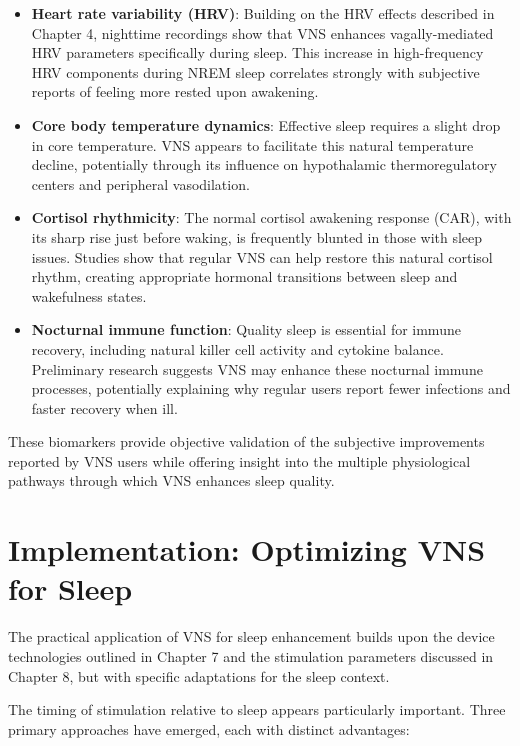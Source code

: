 \documentclass[
  Letterpaper,
]{scrbook}
\begin{document}
\begin{itemize}
\item
  \textbf{Heart rate variability (HRV)}: Building on the HRV effects
  described in Chapter 4, nighttime recordings show that VNS enhances
  vagally-mediated HRV parameters specifically during sleep. This
  increase in high-frequency HRV components during NREM sleep correlates
  strongly with subjective reports of feeling more rested upon
  awakening.
\item
  \textbf{Core body temperature dynamics}: Effective sleep requires a
  slight drop in core temperature. VNS appears to facilitate this
  natural temperature decline, potentially through its influence on
  hypothalamic thermoregulatory centers and peripheral vasodilation.
\item
  \textbf{Cortisol rhythmicity}: The normal cortisol awakening response
  (CAR), with its sharp rise just before waking, is frequently blunted
  in those with sleep issues. Studies show that regular VNS can help
  restore this natural cortisol rhythm, creating appropriate hormonal
  transitions between sleep and wakefulness states.
\item
  \textbf{Nocturnal immune function}: Quality sleep is essential for
  immune recovery, including natural killer cell activity and cytokine
  balance. Preliminary research suggests VNS may enhance these nocturnal
  immune processes, potentially explaining why regular users report
  fewer infections and faster recovery when ill.
\end{itemize}

These biomarkers provide objective validation of the subjective
improvements reported by VNS users while offering insight into the
multiple physiological pathways through which VNS enhances sleep
quality.

\section{Implementation: Optimizing VNS for
Sleep}\label{implementation-optimizing-vns-for-sleep}

The practical application of VNS for sleep enhancement builds upon the
device technologies outlined in Chapter 7 and the stimulation parameters
discussed in Chapter 8, but with specific adaptations for the sleep
context.

The timing of stimulation relative to sleep appears particularly
important. Three primary approaches have emerged, each with distinct
advantages:
\end{document}

